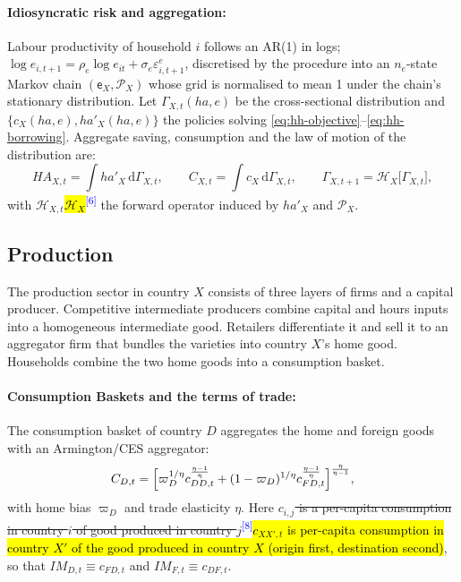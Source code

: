 \documentclass[11pt]{article}
\newcommand{\A}[1]{\hl{#1}}
\newcommand{\D}[1]{{\color{red}\st{#1}}}
\newcommand{\chg}[1]{\textsuperscript{\textcolor{blue}{\scriptsize[#1]}}}
\begin{document}
\paragraph{Idiosyncratic risk and aggregation:} Labour productivity of household $i$ follows an AR(1) in logs; $\log e_{i,t+1}=\rho_{e}\log e_{it}+\sigma_{e}\varepsilon^{e}_{i,t+1}$, discretised by the \citet{rouwenhorst1995asset} procedure into an $n_e$-state Markov chain $(\mathsf{e}_X,\mathcal{P}_X)$ whose grid is normalised to mean 1 under the chain's stationary distribution. Let $\Gamma_{X,t}(ha,e)$ be the cross-sectional
distribution and $\{c_X(ha,e),ha'_X(ha,e)\}$ the policies solving \eqref{eq:hh-objective}--\eqref{eq:hh-borrowing}. Aggregate saving, consumption
and the law of motion of the distribution are:
\begin{equation}
HA_{X,t}=\int ha'_X\,\mathrm{d}\Gamma_{X,t},
\qquad
C_{X,t}=\int c_X\,\mathrm{d}\Gamma_{X,t},
\qquad
\Gamma_{X,t+1}=\mathcal{H}_X\bigl[\Gamma_{X,t}\bigr],
\label{eq:hh-aggregation}
\end{equation}
with \D{$\mathcal{H}_{X,t}$}\A{$\mathcal{H}_X$}\chg{6} the forward operator induced by $ha'_X$ and $\mathcal{P}_X$.

\subsection{Production}
The production sector in country $X$ consists of three layers of firms and a capital producer. Competitive intermediate producers combine capital and hours inputs into a homogeneous intermediate good. Retailers differentiate it and sell it to an aggregator firm that bundles the varieties into country $X$'s home good. Households combine the two home goods into a consumption basket.

\paragraph{Consumption Baskets and the terms of trade:}
The consumption basket of country $D$ aggregates the home and foreign goods with an
Armington/CES aggregator:
\begin{equation}
C_{D,t}=\Bigl[\varpi_D^{1/\eta}c_{DD,t}^{\frac{\eta-1}{\eta}}
+(1-\varpi_D)^{1/\eta}c_{FD,t}^{\frac{\eta-1}{\eta}}\Bigr]^{\frac{\eta}{\eta-1}},
\label{eq:ces-aggregator}
\end{equation}
with home bias $\varpi_D$ and trade elasticity $\eta$. Here \D{$c_{i,j}$ is a per-capita consumption in country $i$ of good produced in country $j$}\chg{8}\A{$c_{XX',t}$ is per-capita consumption in country $X'$ of the good produced in country $X$ (origin first, destination second)}, so that $IM_{D,t}\equiv c_{FD,t}$ and $IM_{F,t}\equiv c_{DF,t}$.
\end{document}
